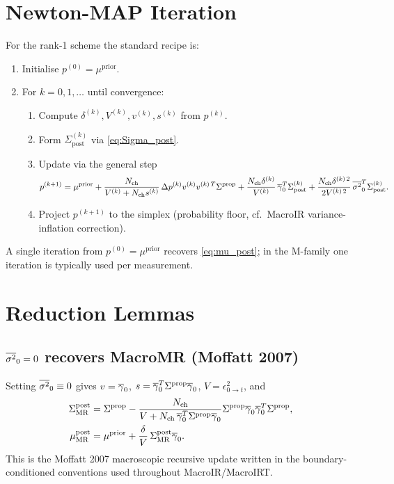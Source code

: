 \documentclass[11pt]{article}
\begin{document}
\section{Newton-MAP Iteration}

For the rank-1 scheme the standard recipe is:
\begin{enumerate}
  \item Initialise $p^{(0)}=\mu^{\mathrm{prior}}$.
  \item For $k=0,1,\dots$ until convergence:
  \begin{enumerate}
    \item Compute $\delta^{(k)},V^{(k)},v^{(k)},s^{(k)}$ from $p^{(k)}$.
    \item Form $\Sigma^{(k)}_{\mathrm{post}}$ via \eqref{eq:Sigma_post}.
    \item Update via the general step
    \[
      p^{(k+1)} = \mu^{\mathrm{prior}}
      + \frac{N_{\mathrm{ch}}}{V^{(k)}+N_{\mathrm{ch}} s^{(k)}}\,\Delta p^{(k)} v^{(k)}v^{(k)\,T}\Sigma^{\mathrm{prop}}
      + \frac{N_{\mathrm{ch}}\delta^{(k)}}{V^{(k)}}\,\overline{\gamma}_0^{T}\Sigma^{(k)}_{\mathrm{post}}
      + \frac{N_{\mathrm{ch}}\delta^{(k)\,2}}{2V^{(k)\,2}}\,\overline{\sigma^2}_0^{T}\Sigma^{(k)}_{\mathrm{post}}.
    \]
    \item Project $p^{(k+1)}$ to the simplex (probability floor, cf.\
          MacroIR variance-inflation correction).
  \end{enumerate}
\end{enumerate}
A single iteration from $p^{(0)}=\mu^{\mathrm{prior}}$ recovers
\eqref{eq:mu_post}; in the M-family one iteration is typically used
per measurement.

\section{Reduction Lemmas}

\subsection{$\overline{\sigma^2}_0=0$ recovers MacroMR (Moffatt 2007)}

Setting $\overline{\sigma^2}_0\equiv 0$ gives $v=\overline{\gamma}_0$, $s=\overline{\gamma}_0^{T}\Sigma^{\mathrm{prop}}\overline{\gamma}_0$,
$V=\epsilon^2_{0\to t}$, and
\begin{align}
  \Sigma^{\mathrm{post}}_{\mathrm{MR}}
  &= \Sigma^{\mathrm{prop}} - \frac{N_{\mathrm{ch}}}{V+N_{\mathrm{ch}}\,\overline{\gamma}_0^{T}\Sigma^{\mathrm{prop}}\overline{\gamma}_0}
     \Sigma^{\mathrm{prop}}\overline{\gamma}_0\overline{\gamma}_0^{T}\Sigma^{\mathrm{prop}},\\
  \mu^{\mathrm{post}}_{\mathrm{MR}}
  &= \mu^{\mathrm{prior}} + \frac{\delta}{V}\,\Sigma^{\mathrm{post}}_{\mathrm{MR}}\overline{\gamma}_0.
\end{align}
This is the Moffatt 2007 macroscopic recursive update written in the
boundary-conditioned conventions used throughout MacroIR/MacroIRT.
\end{document}
